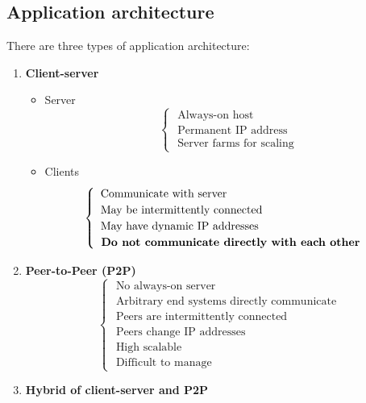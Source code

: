\subsection{Application architecture}
There are three types of application architecture:
\begin{enumerate}
	\item \textbf{Client-server}
	\begin{itemize}
	\item Server
		\begin{equation}
		\begin{cases}
		\text{ Always-on host}\\
        \text{ Permanent IP address}\\
		\text{ Server farms for scaling}
		\end{cases}
		\end{equation}
	\item Clients
		\begin{equation}
		\begin{cases}
		\text{ Communicate with server}\\
		\text{ May be intermittently connected}\\
		\text{ May have dynamic IP addresses}\\
		\text{\textbf{ Do not communicate directly with each other}}
		\end{cases}
		\end{equation}
	\end{itemize}
	\item \textbf{Peer-to-Peer (P2P)}\\ \begin{equation}
	\begin{cases}
	\text{ No always-on server}\\
    \text{ Arbitrary end systems directly communicate}\\
    \text{ Peers are intermittently connected}\\
    \text{ Peers change IP addresses}\\
    \text{ High scalable}\\
    \text{ Difficult to manage}
	\end{cases}
	\end{equation}
    
\item \textbf{Hybrid of client-server and P2P}\\
\end{enumerate}













